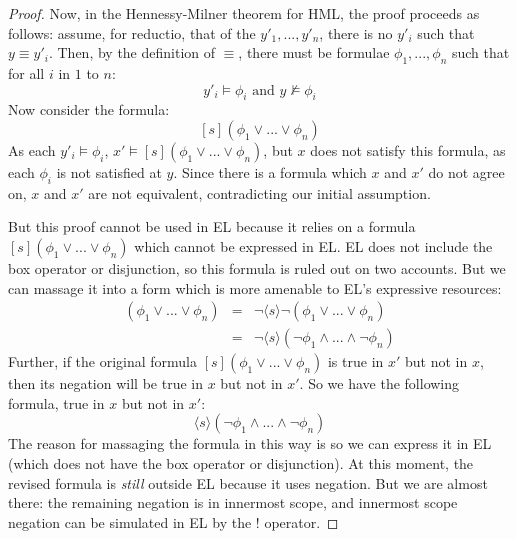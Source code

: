 \begin{proof}
Now, in the Hennessy-Milner theorem for HML, the proof proceeds as follows:
assume, for reductio, that of the $y'_1, ..., y'_n$, there is no $y'_i$ such that $y \equiv y'_i$.
Then, by the definition of $\equiv$, there must be formulae $\phi_1, ..., \phi_n$ such that for all $i$ in $1$ to $n$:
\[
y'_i \models \phi_i \mbox{ and } y \nvDash \phi_i
\]
Now consider the formula:
\[
[s] (\phi_1 \lor ... \lor \phi_n)
\]
As each $y'_i \models \phi_i$, $x' \models [s] (\phi_1 \lor ... \lor \phi_n)$, but $x$ does not satisfy this formula, as each $\phi_i$ is not satisfied at $y$.
Since there is a formula which $x$ and $x'$ do not agree on, $x$ and $x'$ are not equivalent, contradicting our initial assumption.

But this proof cannot be used in EL because it relies on a formula $[s] (\phi_1 \lor ... \lor \phi_n)$ which cannot be expressed in EL. 
EL does not include the box operator or disjunction, so this formula is ruled out on two accounts.
But we can massage it into a form which is more amenable to EL's expressive resources:
\begin{eqnarray}
[s] (\phi_1 \lor ... \lor \phi_n) & = & \neg \langle s \rangle \neg (\phi_1 \lor ... \lor \phi_n) \nonumber \\
	& = & \neg \langle s \rangle (\neg \phi_1\land ... \land \neg \phi_n) \nonumber
\end{eqnarray}
Further, if the original formula $[s] (\phi_1 \lor ... \lor \phi_n)$ is true in $x'$ but not in $x$, then its negation will be true in $x$ but not in $x'$. 
So we have the following formula, true in $x$ but not in $x'$:
\[
 \langle s \rangle (\neg \phi_1\land ... \land \neg \phi_n)
 \]
The reason for massaging the formula in this way is so we can express it in EL (which does not have the box operator or disjunction).
At this moment, the revised formula is \emph{still} outside EL because it uses negation. 
But we are almost there: the remaining negation is in innermost scope, and innermost scope negation can be simulated in EL by the $!$ operator. 


\end{proof}
